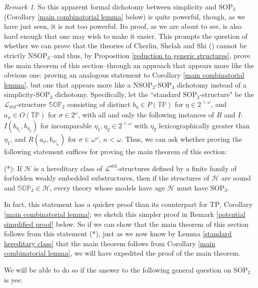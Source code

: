 \documentclass{amsart}
\theoremstyle{definition}
\theoremstyle{remark}
\newtheorem{remark}[theorem]{Remark}
\numberwithin{equation}{section}
\begin{document}
\begin{remark}
    So this apparent formal dichotomy between simplicity and $\mathrm{SOP}_{3}$ (Corollary \ref{main combinatorial lemma} below) is quite powerful, though, as we have just seen, it is not too powerful. Its proof, as we are about to see, is also hard enough that one may wish to make it easier. This prompts the question of whether we can prove that the theories of Cherlin, Shelah and Shi (\cite{CSS99}) cannot be strictly $\mathrm{NSOP}_{3}$--and thus, by Proposition \ref{reduction to generic structures}, prove the main theorem of this section--through an approach that appears more like the obvious one: proving an analogous statement to Corollary \ref{main combinatorial lemma}, but one that appears more like a $\mathrm{NSOP}_{2}$-$\mathrm{SOP}_{3}$ dichotomy instead of a simplicity-$\mathrm{SOP}_{3}$ dichotomy. Specifically, let the ``standard $\mathrm{SOP}_{2}$-structure" be the $\mathcal{L}_{\mathrm{std}}$-structure $\mathbb{SOP}_{2}$ consisting of distinct $b_{\eta} \in P(\mathbb{TP})$ for $\eta \in 2^{< \omega}$, and $a_{\sigma} \in O(\mathbb{TP})$ for $\sigma \in 2^{\omega}$, with all and only the following instances of $R$ and $I$: $I(b_{\eta_1},b_{\eta_2})$ for incomparable $\eta_1, \eta_2 \in 2^{<\omega}$  with $\eta_{2}$ lexicographically greater than $\eta_{1}$, and $R(a_{\sigma}, b_{\sigma|_{n}} )$ for $\sigma \in \omega^{\omega}$, $n < \omega$. Thus, we can ask whether proving the following statement suffices for proving the main theorem of this section:


 (*): If $\mathcal{H}$ is a hereditary class of $\mathcal{L}^{\mathrm{std}}$-structures defined by a finite family of forbidden weakly embedded substructures, then if the structures of $\mathcal{H}$ are sound and $\mathbb{SOP}_2 \in \mathcal{H}$, every theory whose models have age $\mathcal{H}$ must have $\mathrm{SOP}_{3}$.



In fact, this statement has a quicker proof than its counterpart for $\mathrm{TP}$, Corollary \ref{main combinatorial lemma}; we sketch this simpler proof in Remark \ref{potential simplified proof} below. So if we can show that the main theorem of this section follows from this statement (*), just as we now know by Lemma \ref{standard hereditary class} that the main theorem follows from Corollary \ref{main combinatorial lemma}, we will have expedited the proof of the main theorem. 


We will be able to do so if the answer to the following general question on $\mathrm{SOP}_{2}$ is yes:


\end{remark}
\end{document}
